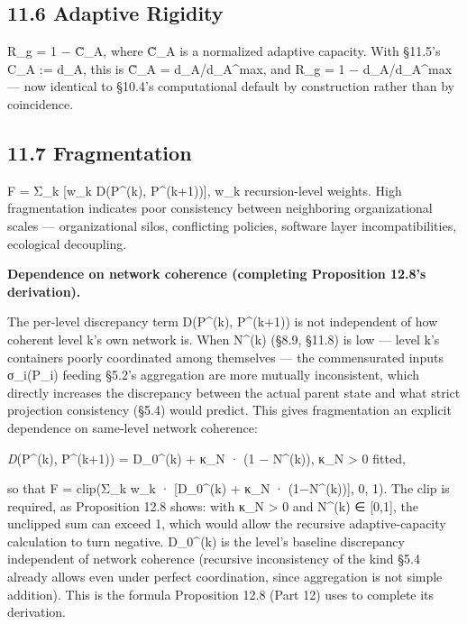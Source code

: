 \documentclass[
]{article}
\begin{document}
\hypertarget{adaptive-rigidity-1}{%
\subsection{11.6 Adaptive Rigidity}\label{adaptive-rigidity-1}}

R\_g = 1 − C̃\_A, where C̃\_A is a normalized adaptive capacity. With
§11.5's C\_A := d\_A, this is C̃\_A = d\_A/d\_A\^{}max, and R\_g = 1 −
d\_A/d\_A\^{}max --- now identical to §10.4's computational default by
construction rather than by coincidence.

\hypertarget{fragmentation}{%
\subsection{11.7 Fragmentation}\label{fragmentation}}

F = Σ\_k {[}w\_k D(P\^{}(k), P\^{}(k+1)){]}, w\_k recursion-level
weights. High fragmentation indicates poor consistency between
neighboring organizational scales --- organizational silos, conflicting
policies, software layer incompatibilities, ecological decoupling.

\textbf{Dependence on network coherence (completing Proposition 12.8's
derivation).}

The per-level discrepancy term D(P\^{}(k), P\^{}(k+1)) is not
independent of how coherent level k's own network is. When N\^{}(k)
(§8.9, §11.8) is low --- level k's containers poorly coordinated among
themselves --- the commensurated inputs σ\_i(P\_i) feeding §5.2's
aggregation are more mutually inconsistent, which directly increases the
discrepancy between the actual parent state and what strict projection
consistency (§5.4) would predict. This gives fragmentation an explicit
dependence on same-level network coherence:

\emph{D}(P\^{}(k), P\^{}(k+1)) = D\_0\^{}(k) + κ\_N · (1 − N\^{}(k)),
κ\_N \textgreater{} 0 fitted,

so that F = clip(Σ\_k w\_k · {[}D\_0\^{}(k) + κ\_N · (1−N\^{}(k)){]}, 0,
1). The clip is required, as Proposition 12.8 shows: with κ\_N
\textgreater{} 0 and N\^{}(k) ∈ {[}0,1{]}, the unclipped sum can exceed
1, which would allow the recursive adaptive-capacity calculation to turn
negative. D\_0\^{}(k) is the level's baseline discrepancy independent of
network coherence (recursive inconsistency of the kind §5.4 already
allows even under perfect coordination, since aggregation is not simple
addition). This is the formula Proposition 12.8 (Part 12) uses to
complete its derivation.
\end{document}
